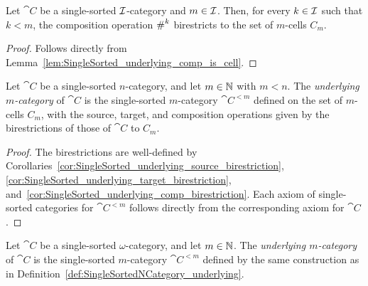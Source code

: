 \begin{corollary}
  \label{cor:SingleSorted_underlying_comp_birestriction}
  \leanok
  Let $\cat{C}$ be a single-sorted $\mathcal{I}$-category and $m \in \mathcal{I}$. Then, for every $k \in
  \mathcal{I}$ such that $k < m$, the composition operation $\operatorname{\#}^k$ birestricts to the set of
  $m$-cells $C_m$.
\end{corollary}

\begin{proof}
  \leanok
  Follows directly from Lemma~\ref{lem:SingleSorted_underlying_comp_is_cell}.
\end{proof}

\begin{construction}
  \label{def:SingleSortedNCategory_underlying}
  \leanok
  Let $\cat{C}$ be a single-sorted $n$-category, and let $m \in \mathbb{N}$ with $m < n$. The
  \emph{underlying $m$-category} of $\cat{C}$ is the single-sorted $m$-category $\cat{C}^{<m}$
  defined on the set of $m$-cells $C_m$, with the source, target, and composition operations given
  by the birestrictions of those of $\cat{C}$ to $C_m$.
\end{construction}

\begin{proof}
  \leanok
  The birestrictions are well-defined by
  Corollaries~\ref{cor:SingleSorted_underlying_source_birestriction},
  \ref{cor:SingleSorted_underlying_target_birestriction},
  and~\ref{cor:SingleSorted_underlying_comp_birestriction}. Each axiom of single-sorted categories
  for $\cat{C}^{<m}$ follows directly from the corresponding axiom for $\cat{C}$.
\end{proof}

\begin{construction}
  \label{def:SingleSortedOmegaCategory_underlying}
  \leanok
  Let $\cat{C}$ be a single-sorted $\omega$-category, and let $m \in \mathbb{N}$. The \emph{underlying
  $m$-category} of $\cat{C}$ is the single-sorted $m$-category $\cat{C}^{<m}$ defined by the same
  construction as in Definition~\ref{def:SingleSortedNCategory_underlying}.
\end{construction}

